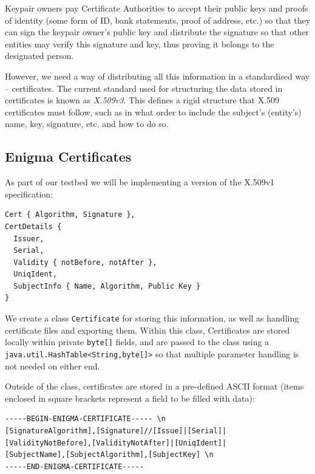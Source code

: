   Keypair owners pay Certificate Authorities to accept their public keys and proofs of identity (some form of ID, bank statements, proof of address, etc.) so that they can sign the keypair owner's public key and distribute the signature so that other entities may verify this signature and key, thus proving it belongs to the designated person.
  
  However, we need a way of distributing all this information in a standardised way -- certificates. The current standard used for structuring the data stored in certificates is known as \emph{X.509v3}\cite{Cooper:2008aa}. This defines a rigid structure that X.509 certificates must follow, such as in what order to include the subject's (entity's) name, key, signature, etc. and how to do so.
  
  \subsection{Enigma Certificates}
  
  As part of our testbed we will be implementing a version of the X.509v1 specification\cite{Kent:1993aa}: \\
  
  \begin{lstlisting}
Cert { Algorithm, Signature },
CertDetails {
  Issuer,
  Serial,
  Validity { notBefore, notAfter },
  UniqIdent,
  SubjectInfo { Name, Algorithm, Public Key }
}
  \end{lstlisting}
  
  We create a class \verb!Certificate! for storing this information, as well as handling certificate files and exporting them. Within this class, Certificates are stored locally within private \verb!byte[]! fields, and are passed to the class using a \verb!java.util.HashTable<String,byte[]>! so that multiple parameter handling is not needed on either end.
  
  Outside of the class, certificates are stored in a pre-defined ASCII format (items enclosed in square brackets represent a field to be filled with data): \\
  
  \begin{lstlisting}
-----BEGIN-ENIGMA-CERTIFICATE----- \n
[SignatureAlgorithm],[Signature]//[Issue]|[Serial]|
[ValidityNotBefore],[ValidityNotAfter]|[UniqIdent]|
[SubjectName],[SubjectAlgorithm],[SubjectKey] \n
-----END-ENIGMA-CERTIFICATE-----
\end{lstlisting}

